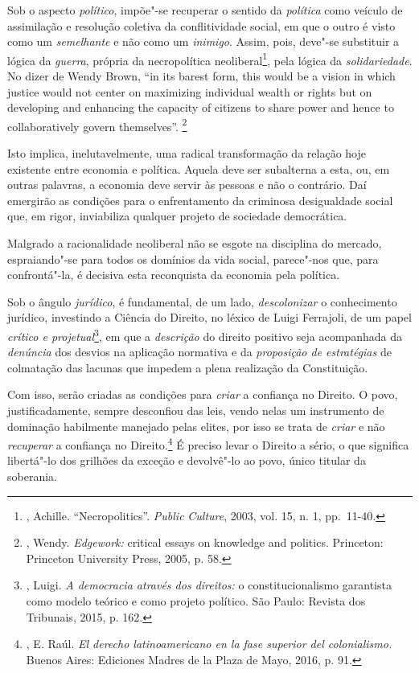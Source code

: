 Sob o aspecto \emph{político}, impõe"-se recuperar o sentido da
\emph{política} como veículo de assimilação e resolução coletiva da
conflitividade social, em que o outro é visto como um \emph{semelhante}
e não como um \emph{inimigo}. Assim, pois, deve"-se substituir a lógica
da \emph{guerra}, própria da necropolítica neoliberal\footnote{,
  Achille. ``Necropolitics''. \emph{Public} \emph{Culture}, 2003, vol.
  15, n. 1, pp.~11-40.}, pela lógica da \emph{solidariedade}. No dizer
de Wendy Brown, ``in its barest form, this would be a vision in which
justice would not center on maximizing individual wealth or rights but
on developing and enhancing the capacity of citizens to share power and
hence to collaboratively govern themselves''. \footnote{, Wendy.
  \emph{Edgework:} critical essays on knowledge and politics. Princeton:
  Princeton University Press, 2005, p. 58.}

Isto implica, inelutavelmente, uma radical transformação da relação hoje
existente entre economia e política. Aquela deve ser subalterna a esta,
ou, em outras palavras, a economia deve servir às pessoas e não o
contrário. Daí emergirão as condições para o enfrentamento da criminosa
desigualdade social que, em rigor, inviabiliza qualquer projeto de
sociedade democrática.

Malgrado a racionalidade neoliberal não se esgote na disciplina do
mercado, espraiando"-se para todos os domínios da vida social, parece"-nos
que, para confrontá"-la, é decisiva esta reconquista da economia pela
política.

Sob o ângulo \emph{jurídico}, é fundamental, de um lado,
\emph{descolonizar} o conhecimento jurídico, investindo a Ciência do
Direito, no léxico de Luigi Ferrajoli, de um papel \emph{crítico e
projetual}\footnote{, Luigi. \emph{A democracia através dos
  direitos:} o constitucionalismo garantista como modelo teórico e como
  projeto político. São Paulo: Revista dos Tribunais, 2015, p. 162.}, em
que a \emph{descrição} do direito positivo seja acompanhada da
\emph{denúncia} dos desvios na aplicação normativa e da \emph{proposição
de estratégias} de colmatação das lacunas que impedem a plena realização
da Constituição.

Com isso, serão criadas as condições para \emph{criar} a confiança no
Direito. O povo, justificadamente, sempre desconfiou das leis, vendo
nelas um instrumento de dominação habilmente manejado pelas elites, por
isso se trata de \emph{criar} e não \emph{recuperar} a confiança no
Direito.\footnote{, E. Raúl. \emph{El derecho latinoamericano
  en la fase superior del colonialismo.} Buenos Aires: Ediciones Madres
  de la Plaza de Mayo, 2016, p. 91.} É preciso levar o Direito a sério,
o que significa libertá"-lo dos grilhões da exceção e devolvê"-lo ao povo,
único titular da soberania.
